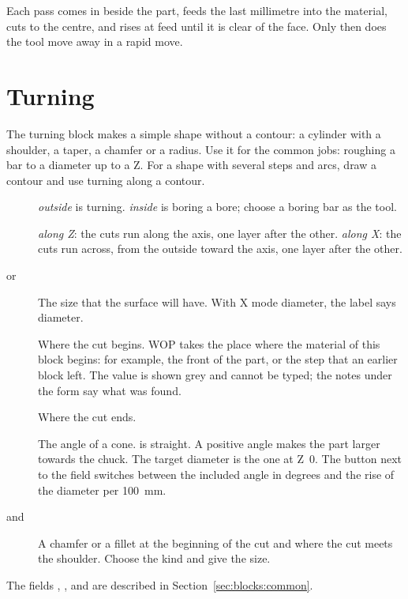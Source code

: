 Each pass comes in beside the part, feeds the last millimetre into the material, cuts to the centre, and rises at feed until it is clear of the face. Only then does the tool move away in a rapid move.

\section{Turning}\label{sec:blocks:turning}


The turning block makes a simple shape without a contour: a cylinder with a shoulder, a taper, a chamfer or a radius. Use it for the common jobs: roughing a bar to a diameter up to a Z. For a shape with several steps and arcs, draw a contour and use turning along a contour.

\begin{description}
\item[] \emph{outside} is turning. \emph{inside} is boring a bore; choose a boring bar as the tool.
\item[] \emph{along Z}: the cuts run along the axis, one layer after the other. \emph{along X}: the cuts run across, from the outside toward the axis, one layer after the other.
\item[ or ] The size that the surface will have. With X mode diameter, the label says diameter.
\item[] Where the cut begins. WOP takes the place where the material of this block begins: for example, the front of the part, or the step that an earlier block left. The value is shown grey and cannot be typed; the notes under the form say what was found.
\item[] Where the cut ends.
\item[] The angle of a cone.  is straight. A positive angle makes the part larger towards the chuck. The target diameter is the one at Z~0. The button next to the field switches between the included angle in degrees and the rise of the diameter per 100~mm.
\item[ and ] A chamfer or a fillet at the beginning of the cut and where the cut meets the shoulder. Choose the kind and give the size.
\end{description}

The fields , ,  and  are described in Section~\ref{sec:blocks:common}.

